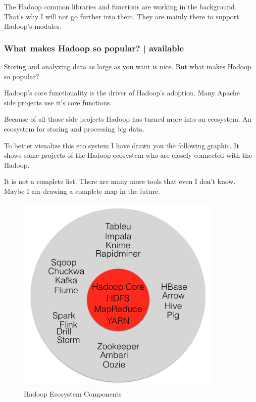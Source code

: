 \documentclass[12pt]{scrartcl} %
\begin{document}
The Hadoop common libraries and functions are working in the background. That’s why I will not go further into them. They are mainly there to support Hadoop’s modules.

\subsubsection{What makes Hadoop so popular? | available}
Storing and analyzing data as large as you want is nice. But what makes Hadoop so popular?

Hadoop’s core functionality is the driver of Hadoop’s adoption. Many Apache side projects use it’s core functions.

Because of all those side projects Hadoop has turned more into an ecosystem. An ecosystem for storing and processing big data.

To better visualize this eco system I have drawn you the following graphic. It shows some projects of the Hadoop ecosystem who are closely connected with the Hadoop.

It is not a complete list. There are many more tools that even I don’t know. Maybe I am drawing a complete map in the future.

\begin{figure}[htbp]
  \centering
     \includegraphics[width=0.9\textwidth]{images/Hadoop-Ecosystem.png}
  \caption{Hadoop Ecosystem Components}
  \label{fig:Bild1}
\end{figure}
\end{document}
